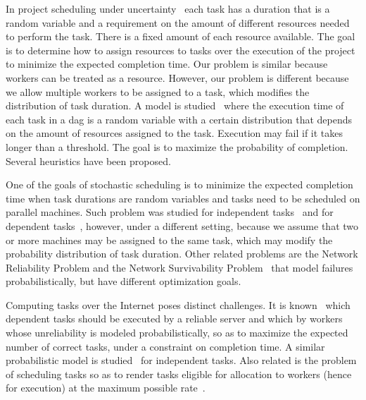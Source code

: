 \documentclass[letterpaper,11pt]{article}
\newcommand{\remove}[1]{}
\begin{document}
In project scheduling under uncertainty~\cite{HL05,FAP98a,FAP98b} each task has a duration that is a random variable and a requirement on the amount of different resources needed to perform the task. There is a fixed amount of each resource available. The goal is to determine how to assign resources to tasks over the execution of the project to minimize the expected completion time. Our problem is similar because workers can be treated as a resource. However, our problem is different because we allow multiple workers to be assigned to a task, which modifies the distribution of task duration.
A model is studied~\cite{TN03} where the execution time of each task in a dag is a random variable with a certain distribution that depends on the amount of resources assigned to the task. Execution may fail if it takes longer than a threshold. The goal is to maximize the probability of completion. Several heuristics have been proposed.

One of the goals of stochastic scheduling is to minimize the expected completion time when task durations are random variables and tasks need to be scheduled on parallel machines. Such problem was studied for independent tasks~\cite{KRT00,GI99} and for dependent tasks~\cite{SU01}, however, under a different setting, because we assume that two or more machines may be assigned to the same task, which may modify the probability distribution of task duration. 
Other related problems are the Network Reliability Problem and the Network Survivability Problem~\cite{GJ79} that model failures probabilistically, but have different optimization goals.


\remove{
Several interesting results on robust scheduling are related to our work (cf.~\cite{AMSK04,STW98,KY96}). Here the goal is to derive schedules whose performance according a given metric is controlled when the input differs from a specific input in a controlled manner.
}


Computing tasks over the Internet poses distinct challenges.
It is known~\cite{GaoM04} which dependent tasks should be executed by a reliable server and which by workers whose unreliability is modeled probabilistically, so as to maximize the expected number of correct tasks, under a constraint on completion time.
A similar probabilistic model is studied~\cite{Sar02} for independent tasks.
Also related is the problem of scheduling tasks so as to render tasks eligible for allocation to workers (hence for execution) at the maximum possible rate~\cite{Rosenberg04,RosenbergY04,MRY05,MalewiczR04,MFRW07,CMR07}.
\end{document}
